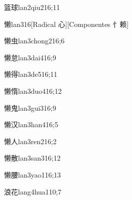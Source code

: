 \begin{verbete}{篮球}{lan2qiu2}{16;11}
\end{verbete}

\begin{verbete}{懒}{lan3}{16}[Radical 心][Componentes 忄赖]
\end{verbete}

\begin{verbete}{懒虫}{lan3chong2}{16;6}
\end{verbete}

\begin{verbete}{懒怠}{lan3dai4}{16;9}
\end{verbete}

\begin{verbete}{懒得}{lan3de5}{16;11}
\end{verbete}

\begin{verbete}{懒惰}{lan3duo4}{16;12}
\end{verbete}

\begin{verbete}{懒鬼}{lan3gui3}{16;9}
\end{verbete}

\begin{verbete}{懒汉}{lan3han4}{16;5}
\end{verbete}

\begin{verbete}{懒人}{lan3ren2}{16;2}
\end{verbete}

\begin{verbete}{懒散}{lan3san3}{16;12}
\end{verbete}

\begin{verbete}{懒腰}{lan3yao1}{16;13}
\end{verbete}

\begin{verbete}{浪花}{lang4hua1}{10;7}
\end{verbete}

